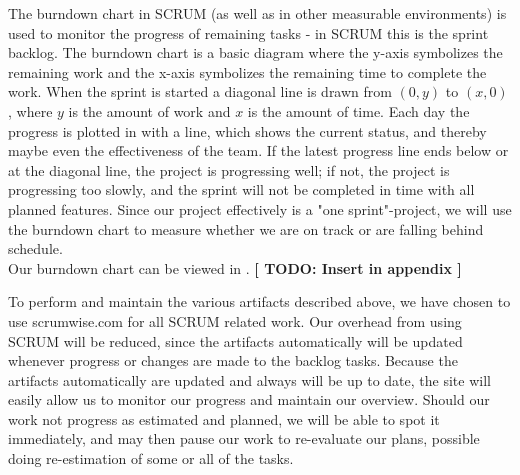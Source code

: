 The burndown chart in SCRUM (as well as in other measurable environments) is used to monitor the progress of remaining tasks - in SCRUM this is the sprint backlog.
The burndown chart is a basic diagram where the y-axis symbolizes the remaining work and the x-axis symbolizes the remaining time to complete the work.
When the sprint is started a diagonal line is drawn from $(0, y)$ to $(x, 0)$, where $y$ is the amount of work and $x$ is the amount of time.
Each day the progress is plotted in with a line, which shows the current status, and thereby maybe even the effectiveness of the team. If the latest progress line ends below or at the diagonal line, the project is progressing well; if not, the project is progressing too slowly, and the sprint will not be completed in time with all planned features.
Since our project effectively is a "one sprint"-project, we will use the burndown chart to measure whether we are on track or are falling behind schedule.\\
Our burndown chart can be viewed in . \textbf{[ TODO: Insert in appendix ]}

To perform and maintain the various artifacts described above, we have chosen to use scrumwise.com for all SCRUM related work. Our overhead from using SCRUM will be reduced, since the artifacts automatically will be updated whenever progress or changes are made to the backlog tasks.
Because the artifacts automatically are updated and always will be up to date, the site will easily allow us to monitor our progress and maintain our overview. Should our work not progress as estimated and planned, we will be able to spot it immediately, and may then pause our work to re-evaluate our plans, possible doing re-estimation of some or all of the tasks.

